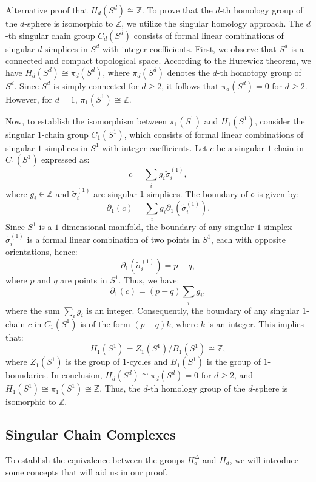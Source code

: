 \begin{example}
Alternative proof that \( H_d(S^d) \cong \mathbb{Z} \). To prove that the \(d\)-th homology group of the \(d\)-sphere is isomorphic to \(\mathbb{Z}\), we utilize the singular homology approach. The \(d\)-th singular chain group \(C_d(S^d)\) consists of formal linear combinations of singular \(d\)-simplices in \(S^d\) with integer coefficients. First, we observe that \(S^d\) is a connected and compact topological space. According to the Hurewicz theorem, we have \( H_d(S^d) \cong \pi_d(S^d) \), where \(\pi_d(S^d)\) denotes the \(d\)-th homotopy group of \(S^d\). Since \(S^d\) is simply connected for \(d \geq 2\), it follows that \(\pi_d(S^d) = 0\) for \(d \geq 2\). However, for \(d = 1\), \(\pi_1(S^1) \cong \mathbb{Z}\).

Now, to establish the isomorphism between \(\pi_1(S^1)\) and \(H_1(S^1)\), consider the singular \(1\)-chain group \(C_1(S^1)\), which consists of formal linear combinations of singular \(1\)-simplices in \(S^1\) with integer coefficients. Let \(c\) be a singular \(1\)-chain in \(C_1(S^1)\) expressed as:
\[
c = \sum_i g_i \tilde{\sigma}^{(1)}_i,
\]
where \(g_i \in \mathbb{Z}\) and \(\tilde{\sigma}^{(1)}_i\) are singular \(1\)-simplices. The boundary of \(c\) is given by:
\[
\partial_1(c) = \sum_i g_i \partial_1(\tilde{\sigma}^{(1)}_i).
\]
Since \(S^1\) is a \(1\)-dimensional manifold, the boundary of any singular \(1\)-simplex \(\tilde{\sigma}^{(1)}_i\) is a formal linear combination of two points in \(S^1\), each with opposite orientations, hence:
\[
\partial_1(\tilde{\sigma}^{(1)}_i) = p - q,
\]
where \(p\) and \(q\) are points in \(S^1\). Thus, we have:
\[
\partial_1(c) = (p - q) \sum_i g_i,
\]
where the sum \(\sum_i g_i\) is an integer. Consequently, the boundary of any singular \(1\)-chain \(c\) in \(C_1(S^1)\) is of the form \((p - q)k\), where \(k\) is an integer. This implies that:
\[
H_1(S^1) = Z_1(S^1) / B_1(S^1) \cong \mathbb{Z},
\]
where \(Z_1(S^1)\) is the group of \(1\)-cycles and \(B_1(S^1)\) is the group of \(1\)-boundaries. In conclusion, \(H_d(S^d) \cong \pi_d(S^d) = 0\) for \(d \geq 2\), and \(H_1(S^1) \cong \pi_1(S^1) \cong \mathbb{Z}\). Thus, the \(d\)-th homology group of the \(d\)-sphere is isomorphic to \(\mathbb{Z}\).
\end{example}

\subsection{Singular Chain Complexes}
\label{Singular Chain Complexes}
To establish the equivalence between the groups $H_d^\Delta$ and $H_d$, we will introduce some concepts that will aid us in our proof.

